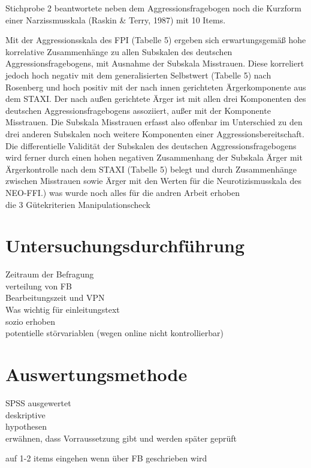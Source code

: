 Stichprobe 2 beantwortete neben dem Aggressionsfragebogen noch die Kurzform einer Narzissmusskala (Raskin \& Terry, 1987) mit 10 Items.

Mit der Aggressionsskala des FPI (Tabelle 5) ergeben sich erwartungsgemäß hohe korrelative Zusammenhänge zu allen Subskalen des deutschen Aggressionsfragebogens, mit Ausnahme der Subskala Misstrauen. Diese korreliert jedoch hoch negativ mit dem generalisierten Selbstwert (Tabelle 5) nach Rosenberg und hoch positiv mit der nach innen gerichteten Ärgerkomponente aus dem STAXI. Der nach außen gerichtete Ärger ist mit allen drei Komponenten des deutschen Aggressionsfragebogens assoziiert, außer mit der Komponente Misstrauen. Die Subskala Misstrauen erfasst also offenbar im Unterschied zu den drei anderen Subskalen noch weitere Komponenten einer Aggressionsbereitschaft. Die differentielle Validität der Subskalen des deutschen Aggressionsfragebogens wird ferner durch einen hohen negativen Zusammenhang der Subskala Ärger mit Ärgerkontrolle nach dem STAXI (Tabelle 5) belegt und durch Zusammenhänge zwischen Misstrauen sowie Ärger mit den Werten für die Neurotizismusskala des NEO-FFI.)
was wurde noch alles für die andren Arbeit erhoben \\ 
die 3 Gütekriterien
Manipulationscheck


\section{Untersuchungsdurchführung}   \label{sec_3.4}
Zeitraum der Befragung \\
verteilung von FB \\
Bearbeitungszeit und VPN \\
Was wichtig für einleitungstext \\
sozio erhoben \\
potentielle störvariablen (wegen online nicht kontrollierbar)


\section{Auswertungsmethode}    \label{sec_3.5}
SPSS ausgewertet \\ %
deskriptive \\ %
hypothesen \\ %
erwähnen, dass Vorraussetzung gibt und werden später geprüft

auf 1-2 items eingehen wenn über FB geschrieben wird